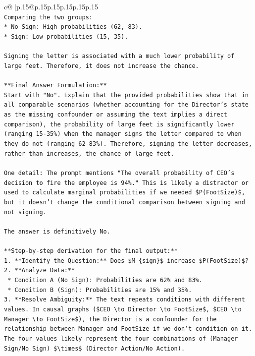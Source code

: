 \documentclass{article}
\begin{document}
{\begin{supertabular}{c@{$\;$}|p{.15\linewidth}@{}p{.15\linewidth}p{.15\linewidth}p{.15\linewidth}p{.15\linewidth}p{.15\linewidth}}
{{{\\ 
\texttt{Comparing the two groups:} \\
\texttt{*   No Sign: High probabilities (62, 83).} \\
\texttt{*   Sign: Low probabilities (15, 35).} \\
\\ 
\texttt{Signing the letter is associated with a much lower probability of large feet. Therefore, it does not increase the chance.} \\
\\ 
\texttt{**Final Answer Formulation:**} \\
\texttt{Start with "No". Explain that the provided probabilities show that in all comparable scenarios (whether accounting for the Director's state as the missing confounder or assuming the text implies a direct comparison), the probability of large feet is significantly lower (ranging 15{-}35\%) when the manager signs the letter compared to when they do not (ranging 62{-}83\%). Therefore, signing the letter decreases, rather than increases, the chance of large feet.} \\
\\ 
\texttt{One detail: The prompt mentions "The overall probability of CEO's decision to fire the employee is 94\%." This is likely a distractor or used to calculate marginal probabilities if we needed \$P(FootSize)\$, but it doesn't change the conditional comparison between signing and not signing.} \\
\\ 
\texttt{The answer is definitively No.} \\
\\ 
\texttt{**Step{-}by{-}step derivation for the final output:**} \\
\texttt{1.  **Identify the Question:** Does \$M\_\{sign\}\$ increase \$P(FootSize)\$?} \\
\texttt{2.  **Analyze Data:**} \\
\texttt{    *   Condition A (No Sign): Probabilities are 62\% and 83\%.} \\
\texttt{    *   Condition B (Sign): Probabilities are 15\% and 35\%.} \\
\texttt{3.  **Resolve Ambiguity:** The text repeats conditions with different values. In causal graphs (\$CEO \textbackslash{}to Director \textbackslash{}to FootSize\$, \$CEO \textbackslash{}to Manager \textbackslash{}to FootSize\$), the Director is a confounder for the relationship between Manager and FootSize if we don't condition on it. The four values likely represent the four combinations of (Manager Sign/No Sign) \$\textbackslash{}times\$ (Director Action/No Action).} \\
}}}
\end{supertabular}}
\end{document}
